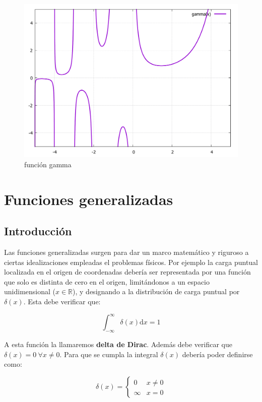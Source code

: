 \documentclass[12pt,a4paper]{book}
\newcommand{\D}{\mathrm{d}}
\newcommand{\inti}{\int_{-\infty}^{\infty}}
\begin{document}
\begin{figure}[h!] \centering
\includegraphics[scale=0.5]{gammafunction.pdf}
\caption{función gamma}
\end{figure}

\newpage


\chapter{Funciones generalizadas}


\section{Introducción}

Las funciones generalizadas surgen para dar un marco matemático y riguroso a ciertas idealizaciones empleadas el problemas físicos. Por ejemplo la carga puntual localizada en el origen de coordenadas debería ser representada por una función que solo es distinta de cero en el origen, limitándonos a un espacio unidimensional ($x \in \mathbb{R}$), y designando a la distribución de carga puntual por $\delta (x)$. Esta debe verificar que:

\begin{equation}
\inti \delta (x) \D x = 1
\end{equation}

A esta función la llamaremos \textbf{delta de Dirac}. Además debe verificar que $\delta (x) = 0 \ \forall x \neq 0$. Para que se cumpla la integral $\delta (x)$ debería poder definirse como:

\begin{equation}
\delta (x) = \left\lbrace \begin{array}{ll}
0 & x \neq 0 \\
\infty & x = 0
\end{array}
\right.
\end{equation}
\end{document}
